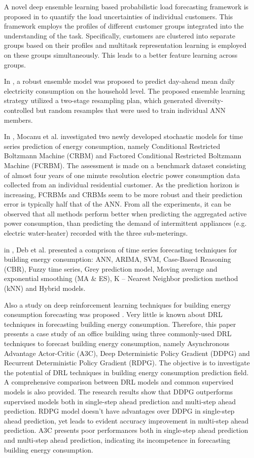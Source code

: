 A novel deep ensemble learning based probabilistic load forecasting framework is proposed in \cite{YANG2019116324} to quantify the load uncertainties of individual customers.
This framework employs the profiles of different customer groups integrated into the understanding of the task.
Specifically, customers are clustered into separate groups based on their profiles and multitask representation learning is employed on these groups simultaneously.
This leads to a better feature learning across groups.

In \cite{ALOBAIDI2018997}, a robust ensemble model was proposed to predict day-ahead mean daily electricity consumption on the household level.
The proposed ensemble learning strategy utilized a two-stage resampling plan, which generated diversity-controlled but random resamples that were used to train individual ANN members.

In \cite{MOCANU201691}, Mocanu et al. investigated two newly developed stochastic models for time series prediction of energy consumption, namely Conditional Restricted Boltzmann Machine (CRBM) and Factored Conditional Restricted Boltzmann Machine (FCRBM).
The assessment is made on a benchmark dataset consisting of almost four years of one minute resolution electric power consumption data collected from an individual residential customer.
As the prediction horizon is increasing, FCRBMs and CRBMs seem to be more robust and their prediction error is typically half that of the ANN.
From all the experiments, it can be observed that all methods perform better when predicting the aggregated active power consumption, than predicting the demand of intermittent appliances (e.g. electric water-heater) recorded with the three sub-meterings.

in \cite{DEB2017902}, Deb et al. presented a comprison of time series forecasting techniques for building energy consumption: ANN, ARIMA, SVM, Case-Based Reasoning (CBR), Fuzzy time series, Grey prediction model, Moving average and exponential smoothing (MA \& ES), K – Nearest Neighbor prediction method (kNN) and Hybrid models.

Also a study on deep reinforcement learning techniques for building energy consumption forecasting was proposed \cite{LIU2020109675}.
Very little is known about DRL techniques in forecasting building energy consumption.
Therefore, this paper presents a case study of an office building using three commonly-used DRL techniques to forecast building energy consumption, namely Asynchronous Advantage Actor-Critic (A3C), Deep Deterministic Policy Gradient (DDPG) and Recurrent Deterministic Policy Gradient (RDPG).
The objective is to investigate the potential of DRL techniques in building energy consumption prediction field.
A comprehensive comparison between DRL models and common supervised models is also provided.
The research results show that DDPG outperforms supervised models both in single-step ahead prediction and multi-step ahead prediction.
RDPG model doesn’t have advantages over DDPG in single-step ahead prediction, yet leads to evident accuracy improvement in multi-step ahead prediction.
A3C presents poor performances both in single-step ahead prediction and multi-step ahead prediction, indicating its incompetence in forecasting building energy consumption.

